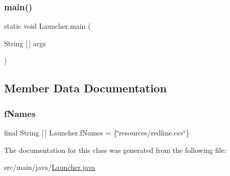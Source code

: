 \subsubsection{\texorpdfstring{main()}{main()}}
{\footnotesize\ttfamily static void Launcher.\+main (\begin{DoxyParamCaption}\item[{String \mbox{[}$\,$\mbox{]}}]{args }\end{DoxyParamCaption})\hspace{0.3cm}{\ttfamily [static]}}



\subsection{Member Data Documentation}
\mbox{\label{classLauncher_a87e12281d7d005f72571c3bbf569dbf2}} 
\subsubsection{\texorpdfstring{f\+Names}{fNames}}
{\footnotesize\ttfamily final String \mbox{[}$\,$\mbox{]} Launcher.\+f\+Names = \{\char`\"{}resources/redline.\+csv\char`\"{}\}\hspace{0.3cm}{\ttfamily [static]}}



The documentation for this class was generated from the following file\+:\begin{DoxyCompactItemize}
\item 
src/main/java/\hyperlink{Launcher_8java}{Launcher.\+java}\end{DoxyCompactItemize}

